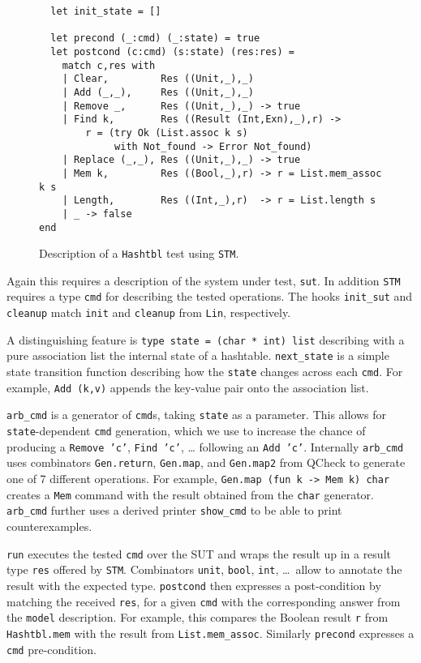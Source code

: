 \documentclass[twocolumn,10pt]{article}
\begin{document}
\begin{figure*}[t]
\begin{minipage}[t]{.49\textwidth}
\begin{lstlisting}
  let init_state = []

  let precond (_:cmd) (_:state) = true
  let postcond (c:cmd) (s:state) (res:res) =
    match c,res with
    | Clear,         Res ((Unit,_),_)
    | Add (_,_),     Res ((Unit,_),_)
    | Remove _,      Res ((Unit,_),_) -> true
    | Find k,        Res ((Result (Int,Exn),_),r) ->
        r = (try Ok (List.assoc k s)
             with Not_found -> Error Not_found)
    | Replace (_,_), Res ((Unit,_),_) -> true
    | Mem k,         Res ((Bool,_),r) -> r = List.mem_assoc k s
    | Length,        Res ((Int,_),r)  -> r = List.length s
    | _ -> false
end
\end{lstlisting}
  \end{minipage}
  \hfil%
  \vspace{-3mm}
  \caption{Description of a \texttt{Hashtbl} test using \texttt{STM}.}%
  \label{code:stm}
\vspace{-1.25em}%
\end{figure*}

Again this requires a description of the system under test, \texttt{sut}. In
addition \texttt{STM} requires a type \texttt{cmd} for describing the tested
operations. The hooks \lstinline|init_sut| and \texttt{cleanup} match \texttt{init} and
\texttt{cleanup} from \texttt{Lin}, respectively.

A distinguishing feature is \texttt{type state = (char * int) list}
describing with a pure association list the internal state of a
hashtable. \lstinline|next_state| is a simple state transition function
describing how the \texttt{state} changes across each \texttt{cmd}. For example,
\texttt{Add (k,v)} appends the key-value pair onto the association list.

\lstinline|arb_cmd| is a generator of \texttt{cmd}s, taking \texttt{state} as a parameter.
This allows for \texttt{state}-dependent \texttt{cmd} generation, which we use
to increase the chance of producing a \texttt{Remove 'c'}, \texttt{Find 'c'}, \dots\@
following an \texttt{Add 'c'}. Internally \lstinline|arb_cmd| uses combinators
\texttt{Gen.return}, \texttt{Gen.map}, and \texttt{Gen.map2} from QCheck to generate one of
7 different operations. For example, \texttt{Gen.map (fun k -> Mem k) char}
creates a \texttt{Mem} command with the result obtained from the \texttt{char}
generator. \lstinline|arb_cmd| further uses a derived printer \lstinline|show_cmd| to
be able to print counterexamples.

\texttt{run} executes the tested \texttt{cmd} over the SUT and wraps the result up
in a result type \texttt{res} offered by \texttt{STM}. Combinators \texttt{unit}, \texttt{bool},
\texttt{int}, \dots~allow to annotate the result with the expected type.
\texttt{postcond} then expresses a post-condition by matching the received
\texttt{res}, for a given \texttt{cmd} with the corresponding answer from the
\texttt{model} description. For example, this compares the Boolean result \texttt{r}
from \texttt{Hashtbl.mem} with the result from \lstinline|List.mem_assoc|. Similarly
\texttt{precond} expresses a \texttt{cmd} pre-condition.
\end{document}
